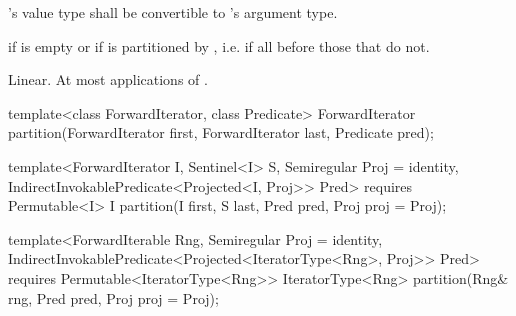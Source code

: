 \begin{itemdescr}
\begin{removedblock}
\pnum
\requires {}'s value type shall be convertible to 's argument type.
\end{removedblock}

\pnum
\returns {} if
 is empty or if
 is partitioned by , i.e. if all
 before those that do not.

\pnum
\complexity Linear. At most  applications of .
\end{itemdescr}

%
\begin{removedblock}
\begin{itemdecl}
template<class ForwardIterator, class Predicate>
  ForwardIterator
    partition(ForwardIterator first,
              ForwardIterator last, Predicate pred);
\end{itemdecl}
\end{removedblock}
\begin{addedblock}
\begin{itemdecl}
template<ForwardIterator I, Sentinel<I> S, Semiregular Proj = identity,
    IndirectInvokablePredicate<Projected<I, Proj>> Pred>
  requires Permutable<I>
  I partition(I first, S last, Pred pred, Proj proj = Proj{});

template<ForwardIterable Rng, Semiregular Proj = identity,
    IndirectInvokablePredicate<Projected<IteratorType<Rng>, Proj>> Pred>
  requires Permutable<IteratorType<Rng>>
  IteratorType<Rng>
    partition(Rng& rng, Pred pred, Proj proj = Proj{});
\end{itemdecl}
\end{addedblock}

